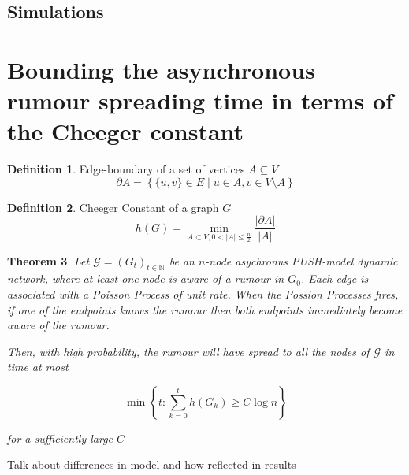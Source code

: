 \documentclass[a4paper,11pt]{article}
\newtheorem{theorem}{Theorem}[section]
\theoremstyle{definition}
\newtheorem{definition}[theorem]{Definition}
\begin{document}
\subsection{Simulations}

\section{Bounding the asynchronous rumour spreading time in terms of the Cheeger constant}

\begin{definition}
	Edge-boundary of a set of vertices $A \subseteq V$
	$$
		\partial A = \left\{ \{u, v\} \in E \mid u \in A, v \in V \setminus A \right\} 
	$$
\end{definition}

\begin{definition}
	Cheeger Constant of a graph $G$
	$$
		h(G) = \min_{A \subset V, 0 < |A| \leq \frac{n}{2}} \frac{|\partial A|}{|A|}
	$$

\end{definition}

\begin{theorem}
	Let $\mathcal{G} = (G_t)_{t \in \mathbb{N}}$ be an $n$-node asychronus PUSH-model dynamic network, where at least one node is aware of a rumour in $G_0$. Each edge is associated with a Poisson Process of unit rate. When the Possion Processes fires, if one of the endpoints knows the rumour then both endpoints immediately become aware of the rumour. %

	Then, with high probability, the rumour will have spread to all the nodes of $\mathcal{G}$ in time at most

	$$
		\min \left\{t : \sum_{k=0}^t h(G_k) \geq C \log n \right\} 
	$$

	\noindent
	for a sufficiently large $C$
\end{theorem}

Talk about differences in model and how reflected in results
\end{document}
